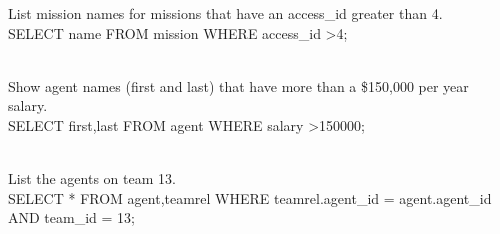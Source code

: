 \documentclass{article}
\begin{document}
\textsf{List mission names for missions that have an access\_id greater than 4.\\
SELECT name FROM mission WHERE access\_id \textgreater 4;\\\\}

\textsf{Show agent names (first and last) that have more than a \$150,000 per year salary.\\
SELECT first,last FROM agent WHERE salary \textgreater 150000;\\\\}

\textsf{List the agents on team 13.\\
SELECT * FROM agent,teamrel WHERE teamrel.agent\_id = agent.agent\_id AND team\_id = 13;\\\\}
\end{document}
